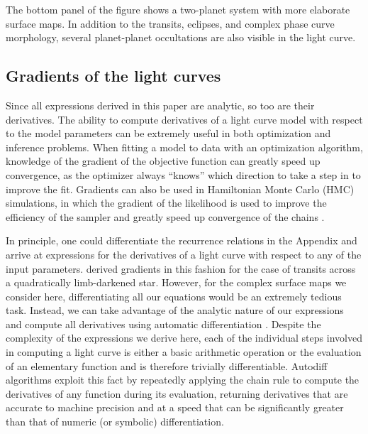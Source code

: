 \documentclass[modern]{aastex61}
\begin{document}
The bottom panel of the figure shows a two-planet system with more elaborate
surface maps. In addition to the transits, eclipses, and complex phase curve
morphology, several planet-planet occultations are also visible in the
light curve.

\subsection{Gradients of the light curves}
\label{sec:gradients}
Since all expressions derived in this paper are analytic, so too are their
derivatives. The ability to compute derivatives of a light curve model with
respect to the model parameters can be extremely useful in both optimization
and inference problems. When fitting a model to data with an optimization
algorithm, knowledge of the gradient of the objective function can greatly
speed up convergence, as the optimizer always ``knows'' which direction to
take a step in to improve the fit. Gradients can also be used in Hamiltonian
Monte Carlo (HMC) simulations, in which the gradient of the likelihood is used
to improve the efficiency of the sampler and greatly speed up convergence of
the chains \citep[e.g.,][]{Betancourt2017}.

In principle, one could differentiate the recurrence relations in
the Appendix and arrive at expressions for the derivatives of a light curve with
respect to any of the input parameters. \citet{Pal2008} derived gradients in
this fashion for the case of transits across a quadratically limb-darkened star.
However, for the complex surface maps we consider here, differentiating all our
equations would be an extremely tedious
task. Instead, we can take advantage of the analytic nature of our expressions
and compute all derivatives using automatic differentiation \citep[autodiff; e.g.,][]{Wengert1964}.
Despite the complexity of the expressions we derive here, each of the individual
steps involved in computing a light curve is either a basic arithmetic operation
or the evaluation of an elementary function and is therefore trivially differentiable.
Autodiff algorithms exploit this fact by repeatedly applying the chain rule to
compute the derivatives of any function during its evaluation, returning derivatives
that are accurate to machine precision and at a speed that can be significantly greater
than that of numeric (or symbolic) differentiation.
\end{document}
